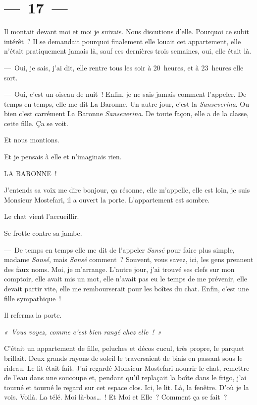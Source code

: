 \documentclass[french,twoside]{book} %
\begin{document}
\section[{— 17 —}]{— 17 —}
\renewcommand{\leftmark}{— 17 —}

\noindent Il montait devant moi et moi je suivais. Nous discutions d’elle. Pourquoi ce subit intérêt ? Il se demandait pourquoi finalement elle louait cet appartement, elle n’était pratiquement jamais là, sauf ces dernières trois semaines, oui, elle était là.\par
— Oui, je sais, j’ai dit, elle rentre tous les soir à 20 heures, et à 23 heures elle sort.\par
— Oui, c’est un oiseau de nuit ! Enfin, je ne sais jamais comment l’appeler. De temps en temps, elle me dit La Baronne. Un autre jour, c’est la \emph{Sanseverina}. Ou bien c’est carrément La Baronne \emph{Sanseverina}. De toute façon, elle a de la classe, cette fille. Ça se voit.\par
Et nous montions.\par
Et je pensais à elle et n’imaginais rien.\par
LA BARONNE !\par
J’entends sa voix me dire bonjour, ça résonne, elle m’appelle, elle est loin, je suis Monsieur Mostefari, il a ouvert la porte. L’appartement est sombre.\par
Le chat vient l’accueillir.\par
Se frotte contre sa jambe.\par
— De temps en temps elle me dit de l’appeler\emph{ Sansé} pour faire plus simple, madame \emph{Sansé}, mais \emph{Sansé} comment ? Souvent, vous savez, ici, les gens prennent des faux noms. Moi, je m’arrange. L’autre jour, j’ai trouvé ses clefs sur mon comptoir, elle avait mis un mot, elle n’avait pas eu le temps de me prévenir, elle devait partir vite, elle me rembourserait pour les boîtes du chat. Enfin, c’est une fille sympathique !\par
Il referma la porte.\par
{\itshape « Vous voyez, comme c’est bien rangé chez elle ! »\par}
C’était un appartement de fille, peluches et décos cucul, très propre, le parquet brillait. Deux grands rayons de soleil le traversaient de biais en passant sous le rideau. Le lit était fait. J’ai regardé Monsieur Mostefari nourrir le chat, remettre de l’eau dans une soucoupe et, pendant qu’il replaçait la boîte dans le frigo, j’ai tourné et tourné le regard sur cet espace clos. Ici, le lit. Là, la fenêtre. D’où je la vois. Voilà. La télé. Moi là-bas… ! Et Moi et Elle ? Comment ça se fait ?\par
\end{document}
